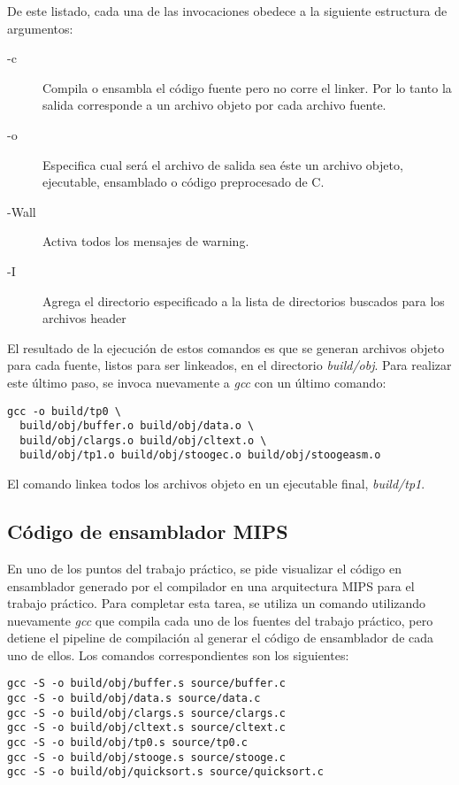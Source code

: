 \documentclass[a4paper,11pt]{article}
\begin{document}
De este listado, cada una de las invocaciones obedece a la siguiente estructura
de argumentos:

\begin{description}

  \item[-c] Compila o ensambla el código fuente pero no corre el linker.  Por
    lo tanto la salida corresponde a un archivo objeto por cada archivo fuente.

  \item[-o] Especifica cual será el archivo de salida sea éste un archivo
    objeto, ejecutable, ensamblado o código preprocesado de C.

  \item[-Wall] Activa todos los mensajes de warning.

  \item[-I] Agrega el directorio especificado a la lista de directorios
    buscados para los archivos header

\end{description}

El resultado de la ejecución de estos comandos es que se generan archivos
objeto para cada fuente, listos para ser linkeados, en el directorio
\textit{build/obj}. Para realizar este último paso, se invoca nuevamente a
\textit{gcc} con un último comando:

\begin{lstlisting}
gcc -o build/tp0 \
  build/obj/buffer.o build/obj/data.o \
  build/obj/clargs.o build/obj/cltext.o \
  build/obj/tp1.o build/obj/stoogec.o build/obj/stoogeasm.o
\end{lstlisting}

El comando linkea todos los archivos objeto en un ejecutable final,
\textit{build/tp1}.

\subsection{Código de ensamblador MIPS}

En uno de los puntos del trabajo práctico, se pide visualizar el código en
ensamblador generado por el compilador en una arquitectura MIPS para el trabajo
práctico. Para completar esta tarea, se utiliza un comando utilizando
nuevamente \textit{gcc} que compila cada uno de los fuentes del trabajo
práctico, pero detiene el pipeline de compilación al generar el código de
ensamblador de cada uno de ellos. Los comandos correspondientes son los
siguientes:

\begin{lstlisting}
gcc -S -o build/obj/buffer.s source/buffer.c
gcc -S -o build/obj/data.s source/data.c
gcc -S -o build/obj/clargs.s source/clargs.c
gcc -S -o build/obj/cltext.s source/cltext.c
gcc -S -o build/obj/tp0.s source/tp0.c
gcc -S -o build/obj/stooge.s source/stooge.c
gcc -S -o build/obj/quicksort.s source/quicksort.c
\end{lstlisting}
\end{document}
